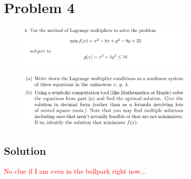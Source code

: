 
\begingroup
\allowdisplaybreaks

\newpage
\section*{Problem 4}

\begin{figure}[h]
	\centering
	\includegraphics[width=0.8\textwidth]{./images/prob4_statement_1.png}
\end{figure}
\begin{figure}[h]
	\centering
	\includegraphics[width=0.8\textwidth]{./images/prob4_statement_2.png}
\end{figure}

\subsection*{Solution}

\textcolor{red}{No clue if I am even in the ballpark right now...}

